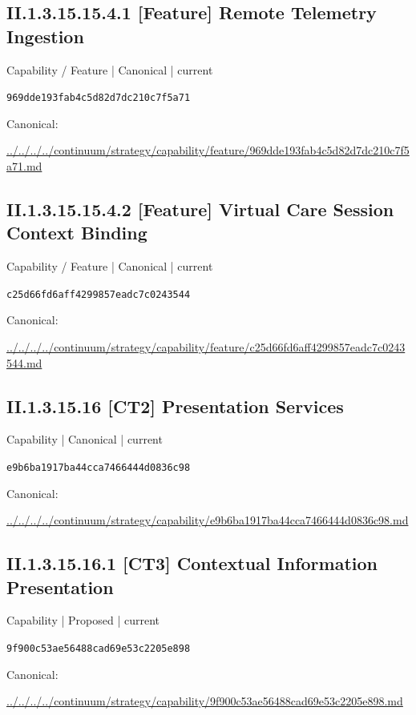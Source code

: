 \documentclass[10pt,a4paper]{article}
\begin{document}
\subsection*{II.1.3.15.15.4.1 [Feature] Remote Telemetry Ingestion}
{\small Capability / Feature | Canonical | current}\par
\texttt{969dde193fab4c5d82d7dc210c7f5a71}\par
Canonical: \par
{\footnotesize\url{../../../../continuum/strategy/capability/feature/969dde193fab4c5d82d7dc210c7f5a71.md}}\par
\subsection*{II.1.3.15.15.4.2 [Feature] Virtual Care Session Context Binding}
{\small Capability / Feature | Canonical | current}\par
\texttt{c25d66fd6aff4299857eadc7c0243544}\par
Canonical: \par
{\footnotesize\url{../../../../continuum/strategy/capability/feature/c25d66fd6aff4299857eadc7c0243544.md}}\par
\subsection*{II.1.3.15.16 [CT2] Presentation Services}
{\small Capability | Canonical | current}\par
\texttt{e9b6ba1917ba44cca7466444d0836c98}\par
Canonical: \par
{\footnotesize\url{../../../../continuum/strategy/capability/e9b6ba1917ba44cca7466444d0836c98.md}}\par
\subsection*{II.1.3.15.16.1 [CT3] Contextual Information Presentation}
{\small Capability | Proposed | current}\par
\texttt{9f900c53ae56488cad69e53c2205e898}\par
Canonical: \par
{\footnotesize\url{../../../../continuum/strategy/capability/9f900c53ae56488cad69e53c2205e898.md}}\par
\end{document}
